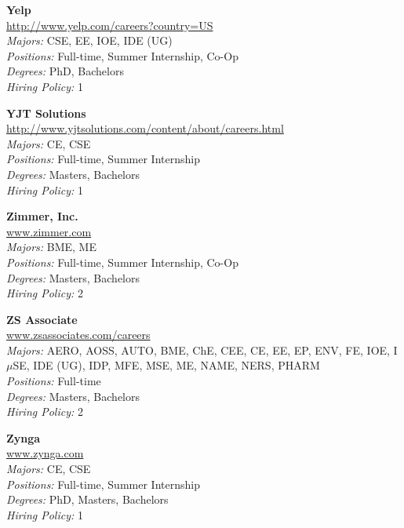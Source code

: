 \documentclass[twoside]{article}
\begin{document}
\begin{center}
\begin{multicols}{3}
\begin{minipage}{.9\columnwidth}{\Large\bf Yelp }\\
	\url{http://www.yelp.com/careers?country=US}\\
	\emph{Majors:} CSE, EE, IOE, IDE (UG)\\
	\emph{Positions:} Full-time, Summer Internship, Co-Op\\
	\emph{Degrees:} PhD, Bachelors\\
	\emph{Hiring Policy:} 1\\
\end{minipage}
 
\begin{minipage}{.9\columnwidth}{\Large\bf YJT Solutions }\\
	\url{http://www.yjtsolutions.com/content/about/careers.html}\\
	\emph{Majors:} CE, CSE\\
	\emph{Positions:} Full-time, Summer Internship\\
	\emph{Degrees:} Masters, Bachelors\\
	\emph{Hiring Policy:} 1\\
\end{minipage}
 
\begin{minipage}{.9\columnwidth}{\Large\bf Zimmer, Inc. }\\
	\url{www.zimmer.com}\\
	\emph{Majors:} BME, ME\\
	\emph{Positions:} Full-time, Summer Internship, Co-Op\\
	\emph{Degrees:} Masters, Bachelors\\
	\emph{Hiring Policy:} 2\\
\end{minipage}
 
\begin{minipage}{.9\columnwidth}{\Large\bf ZS Associate }\\
	\url{www.zsassociates.com/careers}\\
	\emph{Majors:} AERO, AOSS, AUTO, BME, ChE, CEE, CE, EE, EP, ENV, FE, IOE, I$\mu$SE, IDE (UG), IDP, MFE, MSE, ME, NAME, NERS, PHARM\\
	\emph{Positions:} Full-time\\
	\emph{Degrees:} Masters, Bachelors\\
	\emph{Hiring Policy:} 2\\
\end{minipage}
 
\begin{minipage}{.9\columnwidth}{\Large\bf Zynga }\\
	\url{www.zynga.com}\\
	\emph{Majors:} CE, CSE\\
	\emph{Positions:} Full-time, Summer Internship\\
	\emph{Degrees:} PhD, Masters, Bachelors\\
	\emph{Hiring Policy:} 1\\
\end{minipage}
 

\end{multicols}
\end{center}
\end{document}
